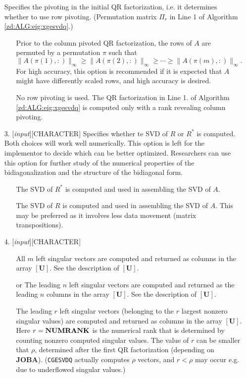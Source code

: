 \documentclass[12pt, a4paper, final]{article}
\numberwithin{equation}{section}
\begin{document}
\begin{itemize}
	Specifies the pivoting in the initial QR factorization, i.e. it determines whether to use row pivoting. (Permutation matrix $\Pi_r$ in Line 1 of Algorithm \ref{zd:ALG:eig:xgesvdq}.)
	\begin{itemize}
		\item[\framebox{'P'}] Prior to the column pivoted QR factorization, the rows of $A$ are permuted by a permutation $\pi$ such that $$\|A(\pi(1),:)\|_\infty \geq \|A(\pi(2),:)\|_\infty\geq\cdots\geq \|A(\pi(m),:)\|_\infty .$$ For high accuracy, this option is recommended if it is expected that $A$ might have differently scaled rows, and high accuracy is desired.
		\item[\framebox{'N'}] No row pivoting is used. The QR factorization in Line 1. of Algorithm \ref{zd:ALG:eig:xgesvdq} is computed only with a rank revealing column pivoting.
	\end{itemize}
	\item[3.]  [\emph{input}][{\sc CHARACTER}]
	Specifies whether te SVD of $R$ or $R^*$ is computed. Both choices will work well numerically. This option is left for the implementor to decide which can be better optimized. Researchers can use this option for further study of the numerical properties of the bidiagonalization and the structure of the bidiagonal form. 
	\begin{itemize}
	\item[\framebox{'T'}] The SVD of $R^*$ is computed and used in assembling the SVD of $A$.    
		\item[\framebox{'N'}] The SVD of $R$ is computed and used in assembling the SVD of $A$. This may be preferred as it involves less data movement (matrix transpositions).  
	\end{itemize}
	\item[4.]  [\emph{input}][{\sc CHARACTER}]
	\begin{itemize}
		\item[\framebox{'A'}] All $m$ left singular vectors are computed and returned as columns in the array $\mathbf{[U]}$. See the description of $\mathbf{[U]}$.
		\item[\framebox{'S'}] or  The leading $n$ left singular vectors are computed and returned as the leading $n$ columns in the array $\mathbf{[U]}$. See the description of $\mathbf{[U]}$.
		\item[\framebox{'R'}] The leading $r$ left singular vectors (belonging to the $r$ largest nonzero singular values) are computed and returned as columns in the array $\mathbf{[U]}$. Here $r=\mbox{\textbf{NUMRANK}}$ is the numerical rank that is determined by counting nonzero computed singular values. The value of $r$ can be smaller that $\rho$, determined after the first QR factorization (depending on \textbf{JOBA}). (\texttt{CGESVDQ} actually computes $\rho$ vectors, and $r<\rho$ may occur e.g. due to underflowed singular values.)

\end{itemize}
\end{itemize}
\end{document}
